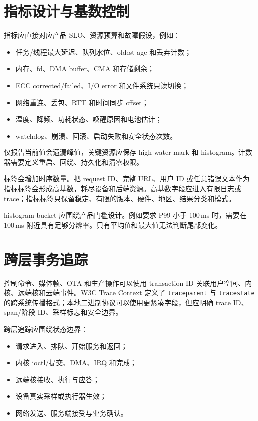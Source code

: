 \section{指标设计与基数控制}

指标应直接对应产品 SLO、资源预算和故障假设，例如：

\begin{itemize}
  \item 任务/线程最大延迟、队列水位、oldest age 和丢弃计数；
  \item 内存、fd、DMA buffer、CMA 和存储剩余；
  \item ECC corrected/failed、I/O error 和文件系统只读切换；
  \item 网络重连、丢包、RTT 和时间同步 offset；
  \item 温度、降频、功耗状态、唤醒原因和电池估计；
  \item watchdog、崩溃、回滚、启动失败和安全状态次数。
\end{itemize}

仅报告当前值会遗漏峰值，关键资源应保存 high-water mark 和 histogram。计数器需要定义重启、回绕、持久化和清零权限。

标签会增加时序数量。把 request ID、完整 URL、用户 ID 或任意错误文本作为指标标签会形成高基数，耗尽设备和后端资源。高基数字段应进入有限日志或 trace；指标标签只保留稳定、有限的版本、硬件、地区、结果分类和模式。

histogram bucket 应围绕产品门槛设计。例如要求 P99 小于 100\,ms 时，需要在 100\,ms 附近具有足够分辨率。只有平均值和最大值无法判断尾部变化。

\section{跨层事务追踪}

控制命令、媒体帧、OTA 和生产操作可以使用 transaction ID 关联用户空间、内核、远端核和云端事件。W3C Trace Context 定义了 \texttt{traceparent} 与 \texttt{tracestate} 的跨系统传播格式\cite{w3c-trace-context}；本地二进制协议可以使用更紧凑字段，但应明确 trace ID、span/阶段 ID、采样标志和安全边界。

跨层追踪应围绕状态边界：

\begin{itemize}
  \item 请求进入、排队、开始服务和返回；
  \item 内核 ioctl/提交、DMA、IRQ 和完成；
  \item 远端核接收、执行与应答；
  \item 设备真实采样或执行器生效；
  \item 网络发送、服务端接受与业务确认。
\end{itemize}

